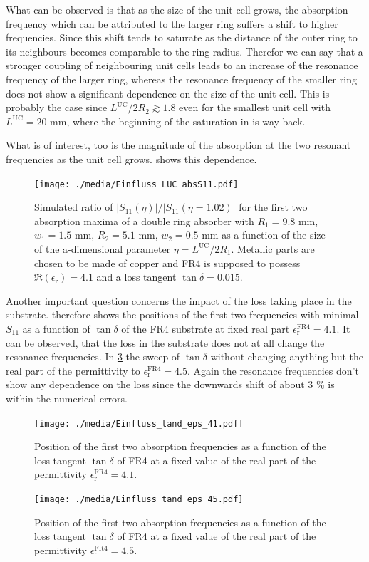 What can be observed is that as the size of the unit cell grows, the absorption frequency which can be attributed to the larger ring suffers a shift to higher frequencies. Since this shift tends to saturate as the distance of the outer ring to its neighbours becomes comparable to the ring radius. Therefor we can say that a stronger coupling of neighbouring unit cells leads to an increase of the resonance frequency of the larger ring, whereas the resonance frequency of the smaller ring does not show a significant dependence on the size of the unit cell. This is probably the case since $L^\mathrm{UC}/2 R_2\gtrsim 1.8$ even for the smallest unit cell with $L^\mathrm{UC}=20$ mm, where the beginning of the saturation in  is way back.

What is of interest, too is the magnitude of the absorption at the two resonant frequencies as the unit cell grows.  shows this dependence.

\begin{figure}
\centering
\texttt{[image: ./media/Einfluss\_LUC\_absS11.pdf]}
\caption{Simulated ratio of $|S_{11}(\eta)|/|S_{11}(\eta=1.02)|$ for the first two absorption maxima of a double ring absorber with $R_1=9.8$ mm, $w_1=1.5$ mm, $R_2=5.1$ mm, $w_2=0.5$ mm as a function of the size of the a-dimensional parameter $\eta = L^\mathrm{UC}/2R_1$. Metallic parts are chosen to be made of copper and FR4 is supposed to possess $\Re\left(\epsilon_\mathrm{r}\right)=4.1$ and a loss tangent $\tan\delta = 0.015$.}
\label{fig:LUC_absS11}
\end{figure}


Another important question concerns the impact of the loss taking place in the substrate.  therefore shows the positions of the first two frequencies with minimal $S_{11}$ as a function of $\tan\delta$ of the FR4 substrate at fixed real part $\epsilon_\mathrm{r}^\text{FR4}=4.1$.
It can be observed, that the loss in the substrate does not at all change the resonance frequencies.
In \cref{fig:tand_fi_45} the sweep of $\tan\delta$ without changing anything but the real part of the permittivity to $\epsilon_\mathrm{r}^\text{FR4}=4.5$. Again the resonance frequencies don't show any dependence on the loss since the downwards shift of about 3 \% is within the numerical errors.

\begin{figure}
\centering
\texttt{[image: ./media/Einfluss\_tand\_eps\_41.pdf]}
\caption{Position of the first two absorption frequencies as a function of the loss tangent $\tan\delta$ of FR4 at a fixed value of the real part of the permittivity $\epsilon_\mathrm{r}^\text{FR4}=4.1$.}
\label{fig:tand_fi_41}
\end{figure}
\begin{figure}
\centering
\texttt{[image: ./media/Einfluss\_tand\_eps\_45.pdf]}
\caption{Position of the first two absorption frequencies as a function of the loss tangent $\tan\delta$ of FR4 at a fixed value of the real part of the permittivity $\epsilon_\mathrm{r}^\text{FR4}=4.5$.}
\label{fig:tand_fi_45}
\end{figure}

